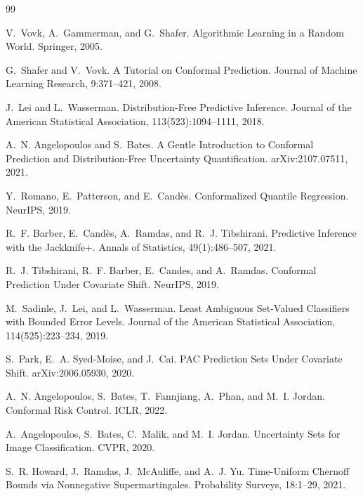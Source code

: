 \documentclass[11pt]{article}
\begin{document}
\begin{thebibliography}{99}

V.~Vovk, A.~Gammerman, and G.~Shafer.
\newblock Algorithmic Learning in a Random World.
\newblock Springer, 2005.

G.~Shafer and V.~Vovk.
\newblock A Tutorial on Conformal Prediction.
\newblock Journal of Machine Learning Research, 9:371--421, 2008.

J.~Lei and L.~Wasserman.
\newblock Distribution-Free Predictive Inference.
\newblock Journal of the American Statistical Association, 113(523):1094--1111, 2018.

A.~N. Angelopoulos and S.~Bates.
\newblock A Gentle Introduction to Conformal Prediction and Distribution-Free Uncertainty Quantification.
\newblock arXiv:2107.07511, 2021.

Y.~Romano, E.~Patterson, and E.~Candès.
\newblock Conformalized Quantile Regression.
\newblock NeurIPS, 2019.

R.~F. Barber, E.~Candès, A.~Ramdas, and R.~J. Tibshirani.
\newblock Predictive Inference with the Jackknife+.
\newblock Annals of Statistics, 49(1):486--507, 2021.

R.~J. Tibshirani, R.~F. Barber, E.~Candes, and A.~Ramdas.
\newblock Conformal Prediction Under Covariate Shift.
\newblock NeurIPS, 2019.

M.~Sadinle, J.~Lei, and L.~Wasserman.
\newblock Least Ambiguous Set-Valued Classifiers with Bounded Error Levels.
\newblock Journal of the American Statistical Association, 114(525):223--234, 2019.

S.~Park, E.~A. Syed-Moise, and J.~Cai.
\newblock PAC Prediction Sets Under Covariate Shift.
\newblock arXiv:2006.05930, 2020.

A.~N. Angelopoulos, S.~Bates, T.~Fannjiang, A.~Phan, and M.~I. Jordan.
\newblock Conformal Risk Control.
\newblock ICLR, 2022.

A.~Angelopoulos, S.~Bates, C.~Malik, and M.~I. Jordan.
\newblock Uncertainty Sets for Image Classification.
\newblock CVPR, 2020.

S.~R. Howard, J.~Ramdas, J.~McAuliffe, and A.~J. Yu.
\newblock Time-Uniform Chernoff Bounds via Nonnegative Supermartingales.
\newblock Probability Surveys, 18:1--29, 2021.


\end{thebibliography}
\end{document}
